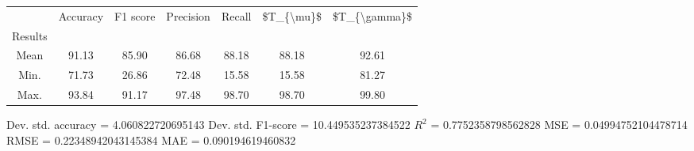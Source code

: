 \begin{tabular}{|c|c|c|c|c|c|c|}
\toprule
{} &  Accuracy &  F1 score &  Precision &  Recall &  \$T\_\{\textbackslash mu\}\$ &  \$T\_\{\textbackslash gamma\}\$ \\
Results &           &           &            &         &            &               \\
\hline
Mean    &     91.13 &     85.90 &      86.68 &   88.18 &      88.18 &         92.61 \\
Min.    &     71.73 &     26.86 &      72.48 &   15.58 &      15.58 &         81.27 \\
Max.    &     93.84 &     91.17 &      97.48 &   98.70 &      98.70 &         99.80 \\
\bottomrule
\end{tabular}

 Dev. std. accuracy = 4.060822720695143
 Dev. std. F1-score = 10.449535237384522
 $R^2$ = 0.7752358798562828
 MSE = 0.04994752104478714
 RMSE = 0.22348942043145384
 MAE = 0.090194619460832